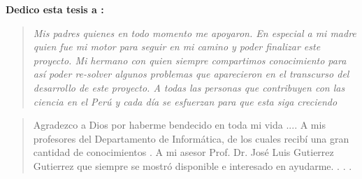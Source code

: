  
 {\bf\Large {Dedico esta tesis a :}}
 \vskip 1cm
\begin{quotation}
{\it Mis padres quienes en todo momento me apoyaron. En especial a mi madre quien fue mi motor para seguir en mi camino y poder finalizar este proyecto.
\vskip 1cm
Mi hermano con quien siempre compartimos conocimiento para así poder re-solver algunos problemas que aparecieron en el transcurso del desarrollo de este proyecto.
\vskip 1cm
A todas las personas que contribuyen con las ciencia en el Perú y cada día se esfuerzan para que esta siga creciendo }
\end{quotation}


\newpage

 {\bf\Large {}}
 \vskip 1.5cm
\begin{quotation}
Agradezco a Dios por haberme bendecido en toda mi vida ....
{\vskip 1cm}
A mis profesores del Departamento de Informática, de los cuales recibí una gran cantidad de conocimientos  . 
\vskip 1cm
A  mi  asesor  Prof.  Dr.  José  Luis  Gutierrez Gutierrez  que  siempre  se  mostró disponible e interesado en ayudarme.
\vskip 1cm
 . . .
 \end{quotation}


